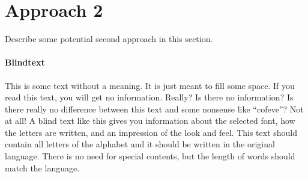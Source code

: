 \section{Approach 2} \label{approach2}  %

Describe some potential second approach in this section.

\paragraph{Blindtext} This is some text without a meaning. It is just meant to fill some space. If you read this text, you will get no information. Really? Is there no information? Is there really no difference between this text and some nonsense like ``cofeve''? Not at all! A blind text like this gives you information about the selected font, how the letters are written, and an impression of the look and feel. This text should contain all letters of the alphabet and it should be written in the original language. There is no need for special contents, but the length of words should match the language.

